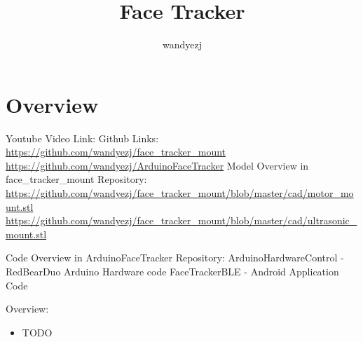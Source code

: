 \documentclass{article}
\title{Face Tracker}
\author{wandyezj}
\begin{document}
	\maketitle
	\tableofcontents
	
	
	
	\clearpage
	
	\section{Overview}
	
	Youtube Video Link: \href{}{}\newline
	Github Links: \href{https://github.com/wandyezj/face_tracker_mount}{https://github.com/wandyezj/face\_tracker\_mount}\newline
	\href{https://github.com/wandyezj/ArduinoFaceTracker}{https://github.com/wandyezj/ArduinoFaceTracker}\newline
	\newline
	Model Overview in face\_tracker\_mount Repository:
	\newline
	\href{Motor Mount}{https://github.com/wandyezj/face\_tracker\_mount/blob/master/cad/motor\_mount.stl}\newline
	\href{Ultrasonic Mount}{https://github.com/wandyezj/face\_tracker\_mount/blob/master/cad/ultrasonic\_mount.stl}\newline
	\newline
	
	Code Overview in ArduinoFaceTracker Repository:
	\newline
	ArduinoHardwareControl - RedBearDuo Arduino Hardware code
	\newline
	FaceTrackerBLE - Android Application Code
	\newline
	\newline
	
	

	Overview:
	\begin{itemize}
		\item TODO
	\end{itemize}
\end{document}

